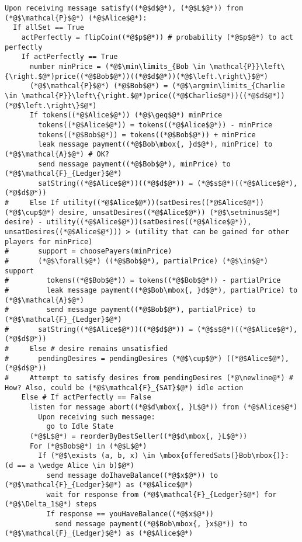 \begin{lstlisting}[label=satfunc, style=numbers]
Upon receiving message satisfy((*@$d$@*), (*@$L$@*)) from (*@$\mathcal{P}$@*) (*@$Alice$@*):
  If allSet == True
    actPerfectly = flipCoin((*@$p$@*)) # probability (*@$p$@*) to act perfectly
    If actPerfectly == True
      number minPrice = (*@$\min\limits_{Bob \in \mathcal{P}}\left\{\right.$@*)price((*@$Bob$@*))((*@$d$@*))(*@$\left.\right\}$@*)
      (*@$\mathcal{P}$@*) (*@$Bob$@*) = (*@$\argmin\limits_{Charlie \in \mathcal{P}}\left\{\right.$@*)price((*@$Charlie$@*))((*@$d$@*))(*@$\left.\right\}$@*)
      If tokens((*@$Alice$@*)) (*@$\geq$@*) minPrice
        tokens((*@$Alice$@*)) = tokens((*@$Alice$@*)) - minPrice
        tokens((*@$Bob$@*)) = tokens((*@$Bob$@*)) + minPrice
        leak message payment((*@$Bob\mbox{, }d$@*), minPrice) to (*@$\mathcal{A}$@*) # OK?
        send message payment((*@$Bob$@*), minPrice) to (*@$\mathcal{F}_{Ledger}$@*)
        satString((*@$Alice$@*))((*@$d$@*)) = (*@$s$@*)((*@$Alice$@*), (*@$d$@*))
#     Else If utility((*@$Alice$@*))(satDesires((*@$Alice$@*)) (*@$\cup$@*) desire, unsatDesires((*@$Alice$@*)) (*@$\setminus$@*) desire) - utility((*@$Alice$@*))(satDesires((*@$Alice$@*)), unsatDesires((*@$Alice$@*))) > (utility that can be gained for other players for minPrice)
#       support = choosePayers(minPrice)
#       (*@$\forall$@*) ((*@$Bob$@*), partialPrice) (*@$\in$@*) support
#         tokens((*@$Bob$@*)) = tokens((*@$Bob$@*)) - partialPrice
#         leak message payment((*@$Bob\mbox{, }d$@*), partialPrice) to (*@$\mathcal{A}$@*)
#         send message payment((*@$Bob$@*), partialPrice) to (*@$\mathcal{F}_{Ledger}$@*)
#       satString((*@$Alice$@*))((*@$d$@*)) = (*@$s$@*)((*@$Alice$@*), (*@$d$@*))
#     Else # desire remains unsatisfied
#       pendingDesires = pendingDesires (*@$\cup$@*) ((*@$Alice$@*), (*@$d$@*))
#     Attempt to satisfy desires from pendingDesires (*@\newline@*) # How? Also, could be (*@$\mathcal{F}_{SAT}$@*) idle action
    Else # If actPerfectly == False
      listen for message abort((*@$d\mbox{, }L$@*)) from (*@$Alice$@*)
        Upon receiving such message:
          go to Idle State
      (*@$L$@*) = reorderByBestSeller((*@$d\mbox{, }L$@*))
      For (*@$Bob$@*) in (*@$L$@*)
        If (*@$\exists (a, b, x) \in \mbox{offeredSats(}Bob\mbox{)}: (d == a \wedge Alice \in b)$@*)
          send message doIhaveBalance((*@$x$@*)) to (*@$\mathcal{F}_{Ledger}$@*) as (*@$Alice$@*)
          wait for response from (*@$\mathcal{F}_{Ledger}$@*) for (*@$\Delta_1$@*) steps
          If response == youHaveBalance((*@$x$@*))
            send message payment((*@$Bob\mbox{, }x$@*)) to (*@$\mathcal{F}_{Ledger}$@*) as (*@$Alice$@*)

\end{lstlisting}
